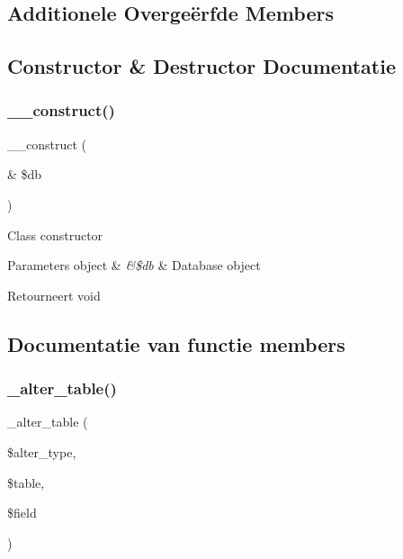 \subsection*{Additionele Overge\"{e}rfde Members}


\subsection{Constructor \& Destructor Documentatie}
\mbox{\label{class_c_i___d_b__postgre__forge_aaf2ef772755ec6f361d44e16cc9ffd69}} 
\subsubsection{\texorpdfstring{\_\_construct()}{\_\_construct()}}
{\footnotesize\ttfamily \+\_\+\+\_\+construct (\begin{DoxyParamCaption}\item[{\&}]{\$db }\end{DoxyParamCaption})}

Class constructor


\begin{DoxyParams}[1]{Parameters}
object & {\em \&\$db} & Database object \\
\hline
\end{DoxyParams}
\begin{DoxyReturn}{Retourneert}
void 
\end{DoxyReturn}


\subsection{Documentatie van functie members}
\mbox{\label{class_c_i___d_b__postgre__forge_a41c6cae02f2fda8b429ad0afb9509426}} 
\subsubsection{\texorpdfstring{\_alter\_table()}{\_alter\_table()}}
{\footnotesize\ttfamily \+\_\+alter\+\_\+table (\begin{DoxyParamCaption}\item[{}]{\$alter\+\_\+type,  }\item[{}]{\$table,  }\item[{}]{\$field }\end{DoxyParamCaption})\hspace{0.3cm}{\ttfamily [protected]}}

